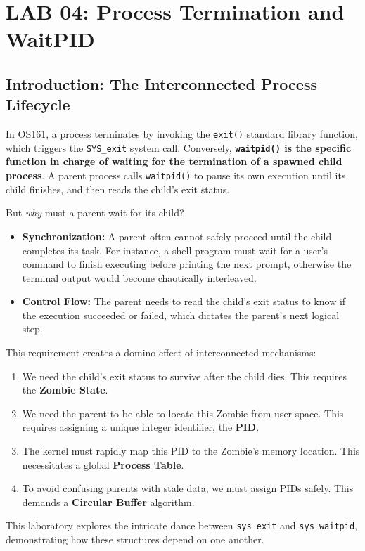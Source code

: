 \chapter{LAB 04: Process Termination and WaitPID}

\section{Introduction: The Interconnected Process Lifecycle}
In OS161, a process terminates by invoking the \texttt{exit()} standard library function, which triggers the \texttt{SYS\_exit} system call. Conversely, \textbf{\texttt{waitpid()} is the specific function in charge of waiting for the termination of a spawned child process}. A parent process calls \texttt{waitpid()} to pause its own execution until its child finishes, and then reads the child's exit status.

But \textit{why} must a parent wait for its child?
\begin{itemize}
    \item \textbf{Synchronization:} A parent often cannot safely proceed until the child completes its task. For instance, a shell program must wait for a user's command to finish executing before printing the next prompt, otherwise the terminal output would become chaotically interleaved.
    \item \textbf{Control Flow:} The parent needs to read the child's exit status to know if the execution succeeded or failed, which dictates the parent's next logical step.
\end{itemize}

This requirement creates a domino effect of interconnected mechanisms:
\begin{enumerate}
    \item We need the child's exit status to survive after the child dies. This requires the \textbf{Zombie State}.
    \item We need the parent to be able to locate this Zombie from user-space. This requires assigning a unique integer identifier, the \textbf{PID}.
    \item The kernel must rapidly map this PID to the Zombie's memory location. This necessitates a global \textbf{Process Table}.
    \item To avoid confusing parents with stale data, we must assign PIDs safely. This demands a \textbf{Circular Buffer} algorithm.
\end{enumerate}
This laboratory explores the intricate dance between \texttt{sys\_exit} and \texttt{sys\_waitpid}, demonstrating how these structures depend on one another.

